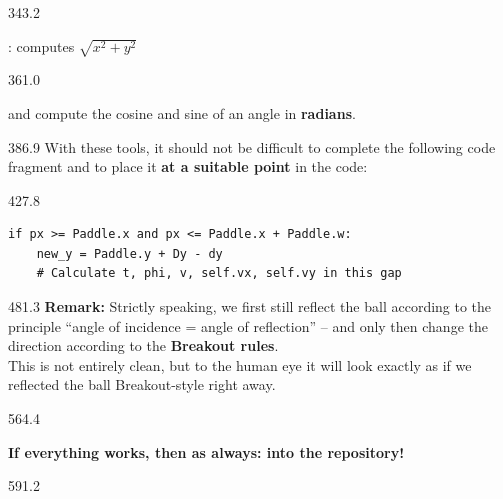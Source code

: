 \documentclass{aslab}
\begin{document}
\begin{region}[x=74.7,right=0]{343.2}
\begin{dotlist}
\item {}: computes $\sqrt{x^2+y^2}$
\end{dotlist}
\end{region}

\begin{region}[x=74.7,right=0]{361.0}
\begin{dotlist}
\item {} and  compute the cosine and sine of an
  angle in \textbf{radians}.
\end{dotlist}
\end{region}

\begin{region}[x=74.7,right=0,pitch=14.1]{386.9}
With these tools, it should not be difficult to complete the following code
fragment and to place it \textbf{at a suitable point} in the code:
\end{region}

\begin{region}[x=74.7,right=0,pitch=13.2]{427.8}
\begin{lstlisting}[style=py]
if px >= Paddle.x and px <= Paddle.x + Paddle.w:
    new_y = Paddle.y + Dy - dy
    # Calculate t, phi, v, self.vx, self.vy in this gap
\end{lstlisting}
\end{region}

\begin{region}[x=74.7,right=0,pitch=13.75]{481.3}
\textbf{Remark:} Strictly speaking, we first still reflect the ball according
to the principle ``angle of incidence = angle of reflection'' -- and only then
change the direction according to the \textbf{Breakout rules}.\\
This is not entirely clean, but to the human eye it will look exactly as if
we reflected the ball Breakout-style right away.
\end{region}

\begin{region}{564.4}
\begin{ntasks}[start=2]
\item \textbf{If everything works, then as always: into the repository!}
\end{ntasks}
\end{region}

\begin{region}[x=74.7,right=0,pitch=13.5]{591.2}
\\
\end{region}
\end{document}
